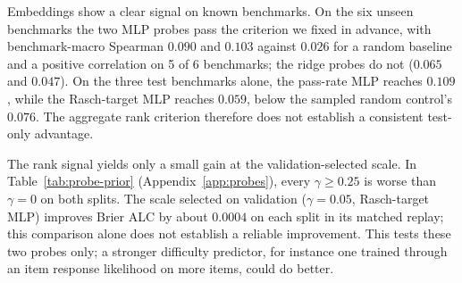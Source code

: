 \label{sec:itemfeat-text}
\begin{table}[!t]
\centering
\caption{Item-difficulty transfer: within-benchmark Spearman correlation and pairwise accuracy between predicted easiness and observed pass rate, averaged across benchmarks. ID: items held out within the 11 training benchmarks; OOD validation and OOD test: three unseen benchmarks each. The additional pass-rate and Rasch-target probes use benchmark-grouped selection and were not evaluated on ID (--).}
\label{tab:item-difficulty}
\small\setlength{\tabcolsep}{4pt}

\end{table}

Embeddings show a clear signal on known benchmarks. On the six unseen benchmarks the two MLP probes pass the criterion we fixed in advance, with benchmark-macro Spearman $0.090$ and $0.103$ against $0.026$ for a random baseline and a positive correlation on 5 of 6 benchmarks; the ridge probes do not ($0.065$ and $0.047$). On the three test benchmarks alone, the pass-rate MLP reaches $0.109$, while the Rasch-target MLP reaches $0.059$, below the sampled random control's $0.076$. The aggregate rank criterion therefore does not establish a consistent test-only advantage.

The rank signal yields only a small gain at the validation-selected scale. In Table~\ref{tab:probe-prior} (Appendix~\ref{app:probes}), every $\gamma\ge0.25$ is worse than $\gamma=0$ on both splits. The scale selected on validation ($\gamma=0.05$, Rasch-target MLP) improves Brier ALC by about $0.0004$ on each split in its matched replay; this comparison alone does not establish a reliable improvement. This tests these two probes only; a stronger difficulty predictor, for instance one trained through an item response likelihood on more items, could do better.

